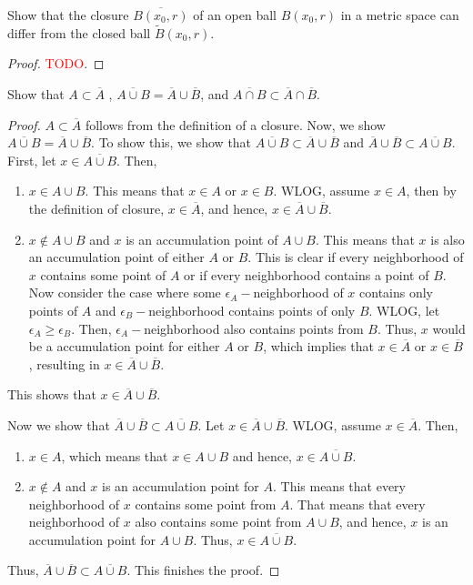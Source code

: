 \begin{question}
    Show that the closure $\overline{B(x_0 , r)}$ of an open ball $B(x_0 , r)$ in a metric space can differ from the closed ball $\tilde{B}(x_0 , r)$.
    \label{section1.3-8}
\end{question}
\begin{proof}
    \textcolor{red}{TODO}.
\end{proof}

\begin{question}
    Show that $A \subset \overline{A}$ , $\overline{A \cup B} = \overline{A} \cup \overline{B}$, and $\overline{A \cap B} \subset \overline{A} \cap \overline{B}$.
    \label{section1.3-9}
\end{question}
\begin{proof}
    $A \subset \overline{A}$ follows from the definition of a closure. Now, we show $\overline{A \cup B} = \overline{A} \cup \overline{B}.$ To show this, we show that $\overline{A \cup B} \subset \overline{A} \cup \overline{B}$ and $\overline{A} \cup \overline{B} \subset \overline{A \cup B}$. First, let $x \in \overline{A \cup B}$. Then, 
    \begin{enumerate}
        \item $x \in A \cup B$. This means that $x \in A$ or $x \in B$. WLOG, assume $x \in A$, then by the definition of closure, $x \in \overline{A}$, and hence, $x \in \overline{A} \cup \overline{B}$.
        \item $x \notin A \cup B$ and $x$ is an accumulation point of $A \cup B$. This means that $x$ is also an accumulation point of either $A$ or $B$. This is clear if every neighborhood of $x$ contains some point of $A$ or if every neighborhood contains a point of $B$. Now consider the case where some $\epsilon_A-$neighborhood of $x$ contains only points of $A$ and $\epsilon_B-$neighborhood contains points of only $B$. WLOG, let $\epsilon_A \geq \epsilon_B$. Then, $\epsilon_A-$neighborhood also contains points from $B$. Thus, $x$ would be a accumulation point for either $A$ or $B$, which implies that $x \in \overline{A}$ or $x \in \overline{B}$, resulting in $x \in \overline{A} \cup \overline{B}$. 
    \end{enumerate}
    This shows that $x \in \overline{A} \cup \overline{B}$. 

    Now we show that $\overline{A} \cup \overline{B} \subset \overline{A \cup B}$. 
    Let $x \in \overline{A} \cup \overline{B}$. WLOG, assume $x \in \overline{A}$. Then, 
    \begin{enumerate}
        \item $x \in A$, which means that $x \in A \cup B$ and hence, $x \in \overline{A \cup B}$. 
        \item $x \notin A$ and $x$ is an accumulation point for $A$. This means that every neighborhood of $x$ contains some point from $A$. That means that every neighborhood of $x$ also contains some point from $A \cup B$, and hence, $x$ is an accumulation point for $A \cup B$. Thus, $x \in  \overline{A \cup B}$.
    \end{enumerate}
    Thus, $\overline{A} \cup \overline{B} \subset \overline{A \cup B}$. This finishes the proof. 


\end{proof}
